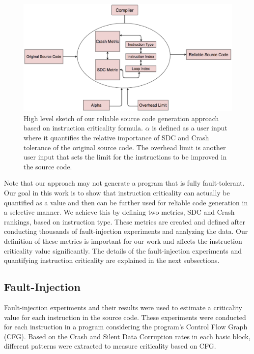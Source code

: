 \begin{figure}[!t]
\begin{center}
\includegraphics[scale=0.3]{./figures/eps_bb.eps}
\end{center}
\caption
{
High level sketch of our reliable source code generation approach based on instruction criticality formula. $\alpha$ is defined as a user input where it quantifies the relative importance of SDC and Crash tolerance of the original source code. The overhead limit is another user input that sets the limit for the instructions to be improved in the source code. 
}
\label{fig:big_picture2}
\end{figure}

Note that our approach may not generate a program that is fully fault-tolerant. Our goal in this work is to show that instruction criticality can actually be quantified as a value and then can be further used for reliable code generation in a selective manner. We achieve this by defining two metrics, SDC and Crash rankings, based on instruction type. These metrics are created and defined after conducting thousands of fault-injection experiments and analyzing the data. Our definition of these metrics is important for our work and affects the instruction criticality value significantly. The details of the fault-injection experiments and quantifying instruction criticality are explained in the next subsections. 


\subsection{Fault-Injection}

Fault-injection experiments and their results were used to estimate a criticality value for each instruction in the source code. These experiments were conducted for each instruction in a program considering the program's Control Flow Graph (CFG). Based on the Crash and Silent Data Corruption rates in each basic block, different patterns were extracted to measure criticality based on CFG. 

